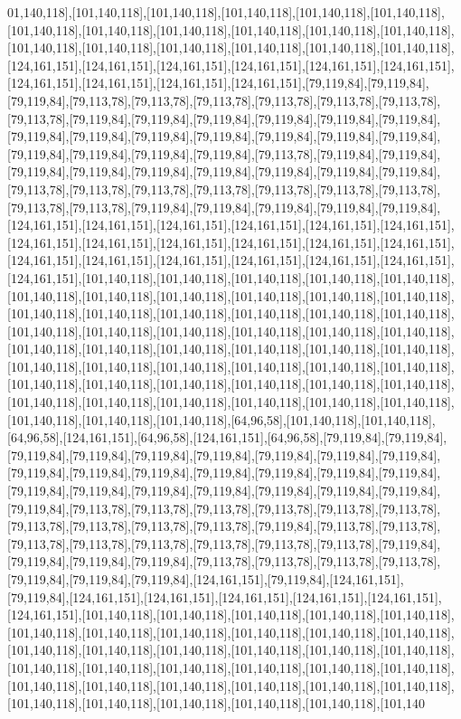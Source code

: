 01,140,118],[101,140,118],[101,140,118],[101,140,118],[101,140,118],[101,140,118],[101,140,118],[101,140,118],[101,140,118],[101,140,118],[101,140,118],[101,140,118],[101,140,118],[101,140,118],[101,140,118],[101,140,118],[101,140,118],[101,140,118],[124,161,151],[124,161,151],[124,161,151],[124,161,151],[124,161,151],[124,161,151],[124,161,151],[124,161,151],[124,161,151],[124,161,151],[79,119,84],[79,119,84],[79,119,84],[79,113,78],[79,113,78],[79,113,78],[79,113,78],[79,113,78],[79,113,78],[79,113,78],[79,119,84],[79,119,84],[79,119,84],[79,119,84],[79,119,84],[79,119,84],[79,119,84],[79,119,84],[79,119,84],[79,119,84],[79,119,84],[79,119,84],[79,119,84],[79,119,84],[79,119,84],[79,119,84],[79,119,84],[79,113,78],[79,119,84],[79,119,84],[79,119,84],[79,119,84],[79,119,84],[79,119,84],[79,119,84],[79,119,84],[79,119,84],[79,113,78],[79,113,78],[79,113,78],[79,113,78],[79,113,78],[79,113,78],[79,113,78],[79,113,78],[79,113,78],[79,119,84],[79,119,84],[79,119,84],[79,119,84],[79,119,84],[124,161,151],[124,161,151],[124,161,151],[124,161,151],[124,161,151],[124,161,151],[124,161,151],[124,161,151],[124,161,151],[124,161,151],[124,161,151],[124,161,151],[124,161,151],[124,161,151],[124,161,151],[124,161,151],[124,161,151],[124,161,151],[124,161,151],[101,140,118],[101,140,118],[101,140,118],[101,140,118],[101,140,118],[101,140,118],[101,140,118],[101,140,118],[101,140,118],[101,140,118],[101,140,118],[101,140,118],[101,140,118],[101,140,118],[101,140,118],[101,140,118],[101,140,118],[101,140,118],[101,140,118],[101,140,118],[101,140,118],[101,140,118],[101,140,118],[101,140,118],[101,140,118],[101,140,118],[101,140,118],[101,140,118],[101,140,118],[101,140,118],[101,140,118],[101,140,118],[101,140,118],[101,140,118],[101,140,118],[101,140,118],[101,140,118],[101,140,118],[101,140,118],[101,140,118],[101,140,118],[101,140,118],[101,140,118],[101,140,118],[101,140,118],[101,140,118],[101,140,118],[101,140,118],[101,140,118],[101,140,118],[64,96,58],[101,140,118],[101,140,118],[64,96,58],[124,161,151],[64,96,58],[124,161,151],[64,96,58],[79,119,84],[79,119,84],[79,119,84],[79,119,84],[79,119,84],[79,119,84],[79,119,84],[79,119,84],[79,119,84],[79,119,84],[79,119,84],[79,119,84],[79,119,84],[79,119,84],[79,119,84],[79,119,84],[79,119,84],[79,119,84],[79,119,84],[79,119,84],[79,119,84],[79,119,84],[79,119,84],[79,119,84],[79,113,78],[79,113,78],[79,113,78],[79,113,78],[79,113,78],[79,113,78],[79,113,78],[79,113,78],[79,113,78],[79,113,78],[79,119,84],[79,113,78],[79,113,78],[79,113,78],[79,113,78],[79,113,78],[79,113,78],[79,113,78],[79,113,78],[79,119,84],[79,119,84],[79,119,84],[79,119,84],[79,113,78],[79,113,78],[79,113,78],[79,113,78],[79,119,84],[79,119,84],[79,119,84],[124,161,151],[79,119,84],[124,161,151],[79,119,84],[124,161,151],[124,161,151],[124,161,151],[124,161,151],[124,161,151],[124,161,151],[101,140,118],[101,140,118],[101,140,118],[101,140,118],[101,140,118],[101,140,118],[101,140,118],[101,140,118],[101,140,118],[101,140,118],[101,140,118],[101,140,118],[101,140,118],[101,140,118],[101,140,118],[101,140,118],[101,140,118],[101,140,118],[101,140,118],[101,140,118],[101,140,118],[101,140,118],[101,140,118],[101,140,118],[101,140,118],[101,140,118],[101,140,118],[101,140,118],[101,140,118],[101,140,118],[101,140,118],[101,140,118],[101,140,118],[101,140,118],[101,140